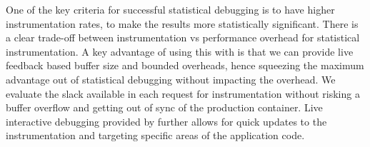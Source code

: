 One of the key criteria for successful statistical debugging is to have higher instrumentation rates, to make the results more statistically significant. 
There is a clear trade-off between instrumentation vs performance overhead for statistical instrumentation. 
A key advantage of using this with \parikshan is that we can provide live feedback based buffer size and bounded overheads, hence squeezing the maximum advantage out of statistical debugging without impacting the overhead. 
We evaluate the slack available in each request for instrumentation without risking a buffer overflow and getting out of sync of the production container.
Live interactive debugging provided by \parikshan further allows for quick updates to the instrumentation and targeting specific areas of the application code.
\fi